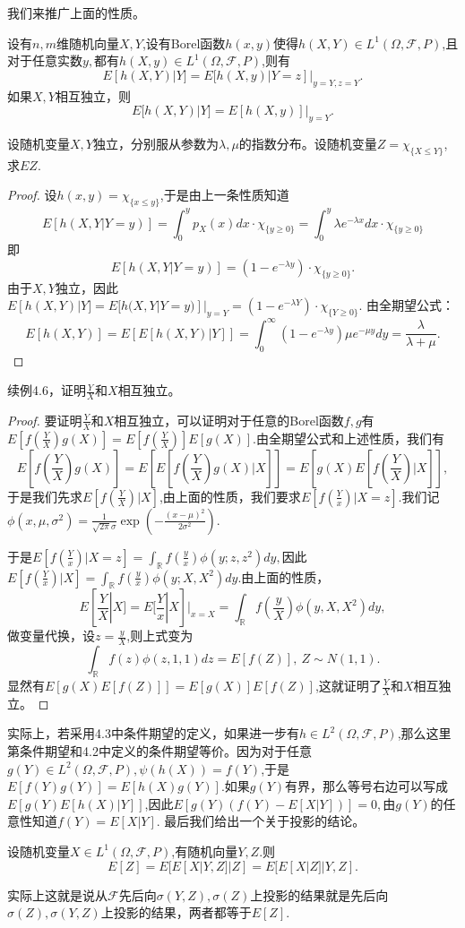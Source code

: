 \documentclass[lang=cn,10pt]{elegantbook}
\begin{document}
	我们来推广上面的性质。
	\begin{proposition}
		设有\(n,m\)维随机向量\(X,Y\),设有Borel函数\(h(x,y)\)使得\(h(X,Y)\in L^1(\Omega,\mathcal{F},P)\),且对于任意实数\(y,\)都有\(h(X,y)\in L^1(\Omega,\mathcal{F},P)\),则有
		\[E[h(X,Y)|Y]=E[h(X,y)|Y=z]|_{y=Y,z=Y}.\]
		如果\(X,Y\)相互独立，则
		\[E[h(X,Y)|Y]=E[h(X,y)]|_{y=Y}.\]
	\end{proposition}
	\begin{example}
		设随机变量\(X,Y\)独立，分别服从参数为\(\lambda,\mu\)的指数分布。设随机变量\(Z=\chi_{\{X\le Y\}}\),求\(EZ\).
	\end{example}
	\begin{proof}
		设\(h(x,y)=\chi_{\{x\le y\}}\),于是由上一条性质知道\[E[h(X,Y|Y=y)]=\int_{0}^{y}p_X(x)dx\cdot \chi_{\{y\ge 0\}}=\int_{0}^{y}\lambda e^{-\lambda x}dx\cdot \chi_{\{y\ge 0\}}\]
		即
		\[E[h(X,Y|Y=y)]=(1-e^{-\lambda y})\cdot \chi_{\{y\ge 0\}}.\]
		由于\(X,Y\)独立，因此\(E[h(X,Y)|Y]=E[h(X,Y|Y=y)]|_{y=Y}=(1-e^{-\lambda Y})\cdot \chi_{\{Y\ge 0\}}.\)
		由全期望公式：
		\[E[h(X,Y)]=E[E[h(X,Y)|Y]]=\int_{0}^{\infty}(1-e^{-\lambda y})\mu e^{-\mu y}dy=\frac{\lambda}{\lambda+\mu}.\]
	\end{proof}
	\begin{example}
		续例4.6，证明\(\frac{Y}{X}\)和\(X\)相互独立。
	\end{example}
	\begin{proof}
		要证明\(\frac{Y}{X}\)和\(X\)相互独立，可以证明对于任意的Borel函数\(f,g\)有\(E[f(\frac{Y}{X})g(X)]=E[f(\frac{Y}{X})]E[g(X)]\).由全期望公式和上述性质，我们有
		\[E[f(\frac{Y}{X})g(X)]=E[E[f(\frac{Y}{X})g(X)|X]]=E[g(X)E[f(\frac{Y}{X})|X]],\]
		于是我们先求\(E[f(\frac{Y}{X})|X]\),由上面的性质，我们要求\(E[f(\frac{Y}{x})|X=z]\).我们记\(\phi(x,\mu,\sigma^2)=\frac{1}{\sqrt{2\pi}\sigma}\exp(-\frac{(x-\mu)^2}{2\sigma^2}).\)
		
		于是\(E[f(\frac{Y}{x})|X=z]=\int_\mathbb{R}f(\frac{y}{x})\phi(y;z,z^2)dy,\)因此\(E[f(\frac{Y}{x})|X]=\int_\mathbb{R}f(\frac{y}{x})\phi(y;X,X^2)dy.\)由上面的性质，
		\[E[\frac{Y}{X}|X]=E[\frac{Y}{x}|X]|_{x=X}=\int_\mathbb{R}f(\frac{y}{X})\phi(y,X,X^2)dy,\]
		做变量代换，设\(z=\frac{y}{X}\),则上式变为
		\[\int_\mathbb{R}f(z)\phi(z,1,1)dz=E[f(Z)],\ Z\sim N(1,1).\]
		显然有\(E[g(X)E[f(Z)]]=E[g(X)]E[f(Z)]\),这就证明了\(\frac{Y}{X}\)和\(X\)相互独立。
	\end{proof}
	实际上，若采用4.3中条件期望的定义，如果进一步有\(h\in L^2(\Omega,\mathcal{F},P)\),那么这里第条件期望和4.2中定义的条件期望等价。因为对于任意\(g(Y)\in L^2(\Omega,\mathcal{F},P),\psi(h(X))=f(Y)\),于是\(E[f(Y)g(Y)]=E[h(X)g(Y)].\)如果\(g(Y)\)有界，那么等号右边可以写成\(E[g(Y)E[h(X)|Y]]\),因此\(E[g(Y)(f(Y)-E[X|Y])]=0,\)由\(g(Y)\)的任意性知道\(f(Y)=E[X|Y]\).
	最后我们给出一个关于投影的结论。
	\begin{proposition}
		设随机变量\(X\in L^1(\Omega,\mathcal{F},P)\),有随机向量\(Y,Z.\)则
		\[E[Z]=E[E[X|Y,Z]|Z]=E[E[X|Z]|Y,Z].\]
	\end{proposition}
	\begin{note}
		实际上这就是说从\(\mathcal{F}\)先后向\(\sigma(Y,Z),\sigma(Z)\)上投影的结果就是先后向\(\sigma(Z),\sigma(Y,Z)\)上投影的结果，两者都等于\(E[Z]\).
	\end{note}
	
\end{document}
